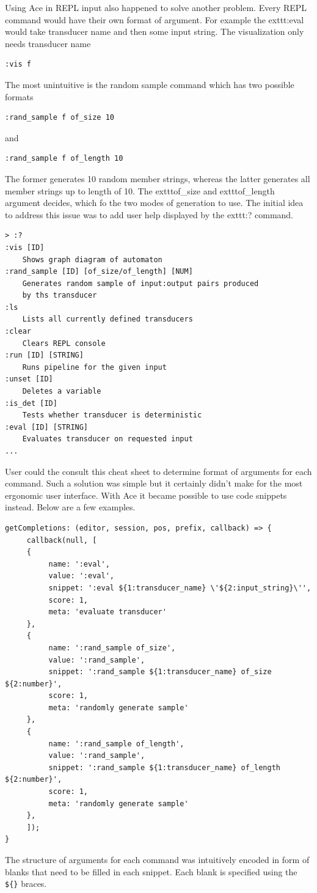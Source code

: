 Using Ace in REPL input also happened to solve another problem. Every REPL command would have their own format of argument. For example the     exttt{:eval} would take transducer name and then some input string. The visualization only needs transducer name
\begin{lstlisting}
:vis f
\end{lstlisting}
 The most unintuitive is the random sample command which has two possible formats
 \begin{lstlisting}
:rand_sample f of_size 10
 \end{lstlisting}
and
 \begin{lstlisting}
:rand_sample f of_length 10
\end{lstlisting}
The former generates 10 random member strings, whereas the latter generates all member strings up to length of 10.
The     exttt{of\_size} and     exttt{of\_length} argument decides, which fo the two modes of generation to use. The initial idea to address this issue was to add user help displayed by the     exttt{:?} command.
\begin{lstlisting}
> :?
:vis [ID]
    Shows graph diagram of automaton
:rand_sample [ID] [of_size/of_length] [NUM]
    Generates random sample of input:output pairs produced 
    by ths transducer
:ls
    Lists all currently defined transducers
:clear
    Clears REPL console
:run [ID] [STRING]
    Runs pipeline for the given input
:unset [ID]
    Deletes a variable
:is_det [ID]
    Tests whether transducer is deterministic
:eval [ID] [STRING]
    Evaluates transducer on requested input
...
\end{lstlisting}
User could the consult this cheat sheet to determine format of arguments for each command. Such a solution was simple but it certainly didn't make for the most ergonomic user interface. With Ace it became possible to use code snippets instead.
Below are a few examples.
\begin{lstlisting}
getCompletions: (editor, session, pos, prefix, callback) => {
     callback(null, [
     {
          name: ':eval',
          value: ':eval',
          snippet: ':eval ${1:transducer_name} \'${2:input_string}\'',
          score: 1,
          meta: 'evaluate transducer'
     },
     {
          name: ':rand_sample of_size',
          value: ':rand_sample',
          snippet: ':rand_sample ${1:transducer_name} of_size ${2:number}',
          score: 1,
          meta: 'randomly generate sample'
     },
     {
          name: ':rand_sample of_length',
          value: ':rand_sample',
          snippet: ':rand_sample ${1:transducer_name} of_length ${2:number}',
          score: 1,
          meta: 'randomly generate sample'
     },
     ]);
}
\end{lstlisting}
The structure of arguments for each command was intuitively encoded in form
of blanks that need to be filled in each snippet. Each blank is specified using the \texttt{\$\{\}} braces.

